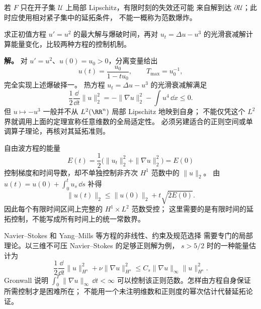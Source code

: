 若 $F$ 只在开子集 $\mathcal U$ 上局部 Lipschitz，有限时刻的失效还可能
来自解到达 $\partial\mathcal U$；此时应使用相对紧子集中的延拓条件，
不能一概称为范数爆炸。

\begin{example}
求正初值方程 $u\prime=u^2$ 的最大解与爆破时间，再对 $u_t=\Delta u-u^3$ 的光滑衰减解计算能量变化，比较两种方程的控制机制。

\textbf{解。} 对 $u'=u^2$、$u(0)=u_0>0$，分离变量给出
\[
u(t)=\frac{u_0}{1-tu_0},\qquad T_{\max}=u_0^{-1},
\]
完全实现上述爆破择一。
热方程 $u_t=\Delta u-u^3$ 的光滑衰减解满足
\[
\frac12\frac{\dd}{\dd t}\|u\|_2^2
=-\|\nabla u\|_2^2-\int u^4\,\dd x\le0.
\]
但 $u\mapsto-u^3$ 一般并不从 $L^2(\RR^n)$ 局部 Lipschitz 地映到自身；
不能仅凭这个 $L^2$ 界就调用上面的定理宣称任意维数的全局适定性。
必须另建适合的正则空间或单调算子理论，再核对其延拓准则。

自由波方程的能量
\[
E(t)=\frac12\bigl(\|u_t\|_2^2+\|\nabla u\|_2^2\bigr)=E(0)
\]
控制梯度和时间导数，却不单独控制非齐次 $H^1$ 范数中的 $\|u\|_2$。
由 $u(t)=u(0)+\int_0^t u_s\,\dd s$ 补得
\[
\|u(t)\|_2\le\|u(0)\|_2+t\sqrt{2E(0)}.
\]
因此每个有限时间区间上完整的 $H^1\times L^2$ 范数受控；
这里需要的是有限时间的延拓控制，不能写成所有时间上的统一常数界。
\end{example}

\begin{note}[含导数的非线性]
Navier--Stokes 和 Yang--Mills 等方程的非线性、约束及规范选择
需要专门的局部理论。以三维不可压 Navier--Stokes 的足够正则解为例，
$s>5/2$ 时的一种能量估计为
\[
\frac12\frac{\dd}{\dd t}\|u\|_{H^s}^2
+\nu\|\nabla u\|_{H^s}^2
\le C_s\|\nabla u\|_\infty\|u\|_{H^s}^2.
\]
Gronwall 说明 $\int_0^T\|\nabla u\|_\infty\,\dd t<\infty$
可以控制该正则范数。怎样由方程自身保证所需控制才是困难所在；
不能用一个未注明维数和正则度的幂次估计代替延拓论证。
\end{note}

